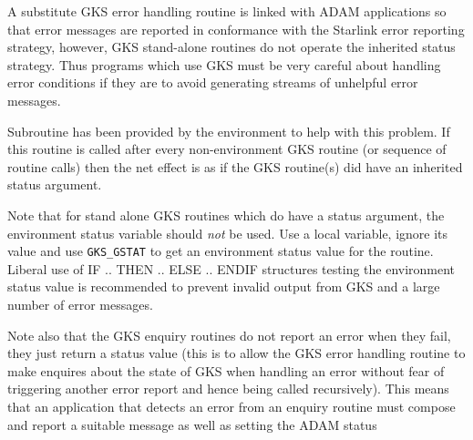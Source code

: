 A substitute GKS error handling routine is linked with ADAM applications so
that error messages are reported in conformance with the Starlink error
reporting strategy, however, GKS stand-alone routines do not operate the
inherited status strategy. Thus programs which use GKS must be very careful
about handling error conditions if they are to avoid generating streams
of unhelpful error messages.

Subroutine 
 has been provided by the environment to help with this problem.
If this routine is called after every non-environment GKS routine
(or sequence of routine calls) then the
net effect is as if the GKS routine(s) did have an inherited status argument.

Note that for stand alone GKS routines which do have a status argument, the
environment status variable should {\em not} be used. Use a local variable,
ignore its value and use {\tt GKS\_GSTAT} to get an environment status value 
for the
routine. Liberal use of IF .. THEN .. ELSE .. ENDIF structures testing the
environment status value is recommended to prevent invalid output from GKS and
a large number of error messages.

Note also that the GKS enquiry routines do not report an error when they fail,
they just return a status value (this is to allow the GKS error handling
routine to make enquires about the state of GKS when handling an error without
fear of triggering another error report and hence being called recursively).
This means that an application that detects an error from an enquiry routine
must compose and report a suitable message as well as setting the ADAM status

